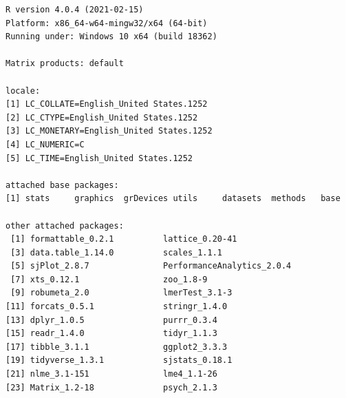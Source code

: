 \documentclass[
  english,
]{book}
\begin{document}
\begin{verbatim}
R version 4.0.4 (2021-02-15)
Platform: x86_64-w64-mingw32/x64 (64-bit)
Running under: Windows 10 x64 (build 18362)

Matrix products: default

locale:
[1] LC_COLLATE=English_United States.1252 
[2] LC_CTYPE=English_United States.1252   
[3] LC_MONETARY=English_United States.1252
[4] LC_NUMERIC=C                          
[5] LC_TIME=English_United States.1252    

attached base packages:
[1] stats     graphics  grDevices utils     datasets  methods   base     

other attached packages:
 [1] formattable_0.2.1          lattice_0.20-41           
 [3] data.table_1.14.0          scales_1.1.1              
 [5] sjPlot_2.8.7               PerformanceAnalytics_2.0.4
 [7] xts_0.12.1                 zoo_1.8-9                 
 [9] robumeta_2.0               lmerTest_3.1-3            
[11] forcats_0.5.1              stringr_1.4.0             
[13] dplyr_1.0.5                purrr_0.3.4               
[15] readr_1.4.0                tidyr_1.1.3               
[17] tibble_3.1.1               ggplot2_3.3.3             
[19] tidyverse_1.3.1            sjstats_0.18.1            
[21] nlme_3.1-151               lme4_1.1-26               
[23] Matrix_1.2-18              psych_2.1.3               


\end{verbatim}
\end{document}
